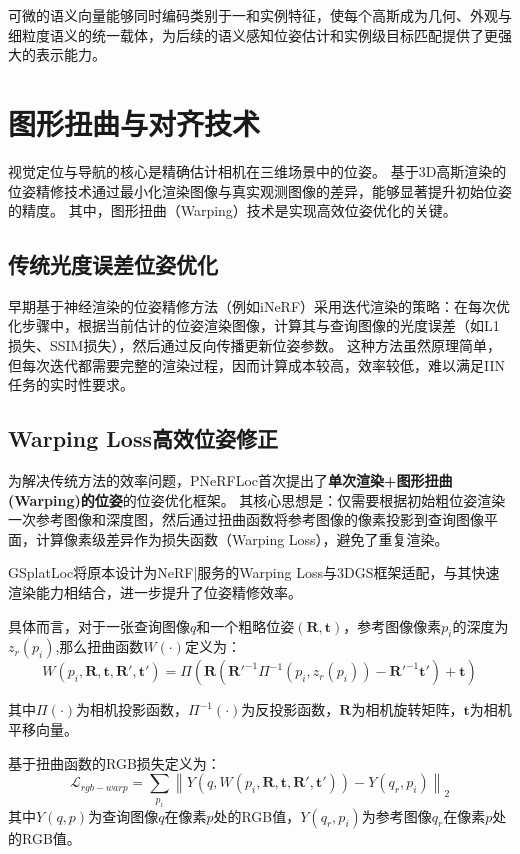 可微的语义向量能够同时编码类别于一和实例特征，使每个高斯成为几何、外观与细粒度语义的统一载体，为后续的语义感知位姿估计和实例级目标匹配提供了更强大的表示能力。

\section{图形扭曲与对齐技术}
视觉定位与导航的核心是精确估计相机在三维场景中的位姿。
基于3D高斯渲染的位姿精修技术通过最小化渲染图像与真实观测图像的差异，能够显著提升初始位姿的精度。
其中，图形扭曲（Warping）技术是实现高效位姿优化的关键。

\subsection{传统光度误差位姿优化}
早期基于神经渲染的位姿精修方法（例如iNeRF\cite{inerf}）采用迭代渲染的策略：在每次优化步骤中，根据当前估计的位姿渲染图像，计算其与查询图像的光度误差（如L1损失、SSIM损失），然后通过反向传播更新位姿参数。
这种方法虽然原理简单，但每次迭代都需要完整的渲染过程，因而计算成本较高，效率较低，难以满足IIN任务的实时性要求。

\subsection{Warping Loss高效位姿修正}
为解决传统方法的效率问题，PNeRFLoc\cite{pnerfloc}首次提出了\textbf{单次渲染+图形扭曲(Warping)的位姿}的位姿优化框架。
其核心思想是：仅需要根据初始粗位姿渲染一次参考图像和深度图，然后通过扭曲函数将参考图像的像素投影到查询图像平面，计算像素级差异作为损失函数（Warping Loss），避免了重复渲染。

GSplatLoc\cite{gsplatloc}将原本设计为NeRF|\cite{nerf}服务的Warping Loss与3DGS框架适配，与其快速渲染能力相结合，进一步提升了位姿精修效率。

具体而言，对于一张查询图像$q$和一个粗略位姿$(\boldsymbol{R},\boldsymbol{t})$，参考图像像素$p_i$的深度为$z_r(p_i)$,那么扭曲函数$W(\cdot)$定义为：
\begin{equation}
    W(p_i,\boldsymbol{R},\boldsymbol{t},\boldsymbol{R}',\boldsymbol{t}')=\Pi {(\boldsymbol{R}(\boldsymbol{R}'^{-1} \Pi ^{-1}(p_i,z_r(p_i))-\boldsymbol{R}'^{-1}\boldsymbol{t}')+\boldsymbol{t})}
\end{equation}

其中$\Pi (\cdot)$为相机投影函数，$\Pi ^{-1}(\cdot)$为反投影函数，$\boldsymbol{R}$为相机旋转矩阵，$\boldsymbol{t}$为相机平移向量。

基于扭曲函数的RGB损失定义为：
\begin{equation}
   \mathcal{L}_{rgb-warp}=\sum _{p_i}\left\lVert Y(q,W(p_i,\boldsymbol{R},\boldsymbol{t},\boldsymbol{R}',\boldsymbol{t}'))-Y(q_r,p_i)\right\rVert _2
\end{equation}
其中$Y(q,p)$为查询图像$q$在像素$p$处的RGB值，$Y(q_r,p_i)$为参考图像$q_r$在像素$p$处的RGB值。

